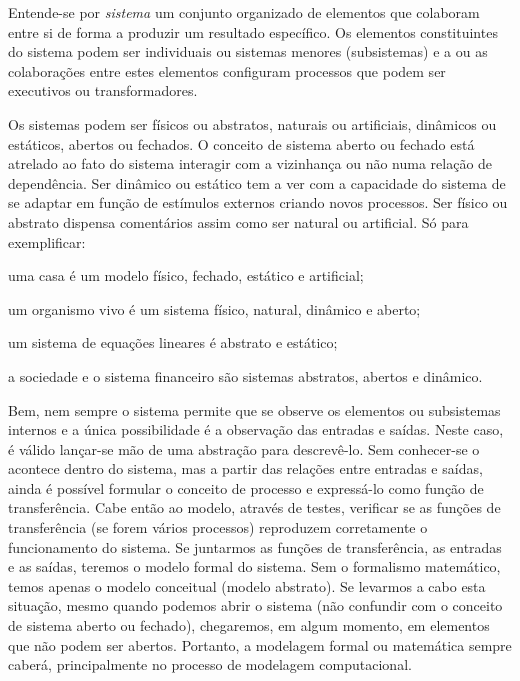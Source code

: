 \documentclass[a4paper,12pt,oneside,onecolumn]{uerj}
\begin{document}
Entende-se por \emph{sistema} um conjunto organizado de elementos que colaboram entre si de forma a produzir um resultado específico. Os elementos constituintes do sistema podem ser individuais ou sistemas menores (subsistemas) e a ou as colaborações entre estes elementos configuram processos que podem ser executivos ou transformadores.

Os sistemas podem ser físicos ou abstratos, naturais ou artificiais, dinâmicos ou estáticos, abertos ou fechados. O conceito de sistema aberto ou fechado está atrelado ao fato do sistema interagir com a vizinhança ou não numa relação de dependência. Ser dinâmico ou estático tem a ver com a capacidade do sistema de se adaptar em função de estímulos externos criando novos processos. Ser físico ou abstrato dispensa comentários assim como ser natural ou artificial. Só para exemplificar: 

\begin{lcircp}
    \item uma casa é um modelo físico, fechado, estático e artificial;
    \item um organismo vivo é um sistema físico, natural, dinâmico e aberto;
    \item um sistema de equações lineares é abstrato e estático;
    \item a sociedade e o sistema financeiro são sistemas abstratos, abertos e dinâmico.\\ 
\end{lcircp}

Bem, nem sempre o sistema permite que se observe os elementos ou subsistemas internos e a única possibilidade é a observação das entradas e saídas. Neste caso, é válido lançar-se mão de uma abstração para descrevê-lo. Sem conhecer-se o acontece dentro do sistema, mas a partir das relações entre entradas e saídas, ainda é possível formular o conceito de processo e expressá-lo como função de transferência. Cabe então ao modelo, através de testes, verificar se as funções de transferência (se forem vários processos) reproduzem corretamente o funcionamento do sistema. Se juntarmos as funções de transferência, as entradas e as saídas, teremos o modelo formal do sistema. Sem o formalismo matemático, temos apenas o modelo conceitual (modelo abstrato). Se levarmos a cabo esta situação, mesmo quando podemos abrir o sistema (não confundir com o conceito de sistema aberto ou fechado), chegaremos, em algum momento, em elementos que não podem ser abertos. Portanto, a modelagem formal ou matemática sempre caberá, principalmente no processo de modelagem computacional.
\end{document}
